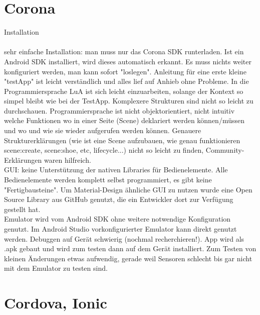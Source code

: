 \section{Corona}

Installation
\\
\\
sehr einfache Installation: man muss nur das Corona SDK runterladen. Ist ein Android SDK installiert, wird dieses automatisch erkannt. Es muss nichts weiter konfiguriert werden, man kann sofort "loslegen". Anleitung für eine erste kleine "testApp" ist leicht verständlich und alles lief auf Anhieb ohne Probleme. In die Programmiersprache LuA ist sich leicht einzuarbeiten, solange der Kontext so simpel bleibt wie bei der TestApp. Komplexere Strukturen sind nicht so leicht zu durchschauen. Programmiersprache ist nicht objektorientiert, nicht intuitiv welche Funktionen wo in einer Seite (Scene) deklariert werden können/müssen und wo und wie sie wieder aufgerufen werden können. Genauere Strukturerklärungen (wie ist eine Scene aufzubauen, wie genau funktionieren scene:create, scene:shoe, etc, lifecycle...) nicht so leicht zu finden, Community-Erklärungen waren hilfreich.
\\
GUI: keine Unterstützung der nativen Libraries für Bedienelemente. Alle Bedienelemente werden komplett selbst programmiert, es gibt keine "Fertigbausteine". Um Material-Design ähnliche GUI zu nutzen wurde eine Open Source Library aus GitHub genutzt, die ein Entwickler dort zur Verfügung gestellt hat. 
\\
Emulator wird vom Android SDK ohne weitere notwendige Konfiguration genutzt. Im Android Studio vorkonfigurierter Emulator kann direkt genutzt werden. Debuggen auf Gerät schwierig (nochmal recherchieren!). App wird als .apk gebaut und wird zum testen dann auf dem Gerät installiert. Zum Testen von kleinen Änderungen etwas aufwendig, gerade weil Sensoren schlecht bis gar nicht mit dem Emulator zu testen sind. 

\section{Cordova, Ionic}

